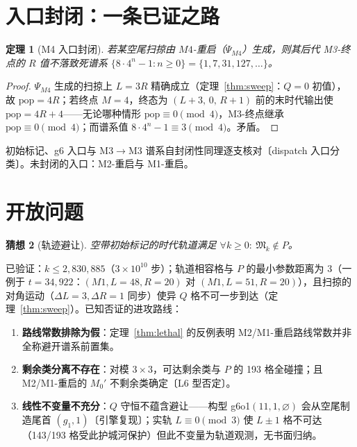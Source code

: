 \documentclass[11pt]{ctexart}
\newtheorem{theorem}{定理}[section]
\newtheorem{conjecture}[theorem]{猜想}
\begin{document}
\section{入口封闭：一条已证之路}

\begin{theorem}[M4 入口封闭]\label{thm:m4}
若某空尾扫掠由 $M4$-重启（$\Psi_{M4}$）生成，则其后代 M3-终点的 $R$ 值不落致死谱系 $\{8\cdot4^n-1:n\ge0\}=\{1,7,31,127,\dots\}$。
\end{theorem}
\begin{proof}
$\Psi_{M4}$ 生成的扫掠上 $L=3R$ 精确成立（定理~\ref{thm:sweep}：$Q=0$ 初值），故 $\mathrm{pop}=4R$；若终点 $M=4$，终态为 $(L{+}3,\,0,\,R{+}1)$ 前的末时代输出使 $\mathrm{pop}=4R{+}4$——无论哪种情形 $\mathrm{pop}\equiv0\pmod4$，M3-终点继承 $\mathrm{pop}\equiv0\pmod4$；而谱系值 $8\cdot4^n-1\equiv 3\pmod 4$。矛盾。
\end{proof}

初始标记、g6 入口与 M3$\to$M3 谱系自封闭性同理逐支核对〔dispatch 入口分类〕。未封闭的入口：M2-重启与 M1-重启。

\section{开放问题}\label{sec:open}

\begin{conjecture}[轨迹避让]\label{conj:avoid}
空带初始标记的时代轨道满足 $\forall k\ge0:\ \mathfrak M_k\notin P$。
\end{conjecture}

已验证：$k\le2{,}830{,}885$（$3\times10^{10}$ 步）；轨道相容格与 $P$ 的最小参数距离为 $3$（一例于 $t=34{,}922$：$(M1,L{=}48,R{=}20)$ 对 $(M1,L{=}51,R{=}20)$），且扫掠的对角运动（$\Delta L=3,\Delta R=1$ 同步）使异 $Q$ 格不可一步到达（定理~\ref{thm:sweep}）。已知否证的进攻路线：

\begin{enumerate}
\item \textbf{路线常数排除为假}：定理~\ref{thm:lethal} 的反例表明 M2/M1-重启路线常数并非全称避开谱系前置集。
\item \textbf{剩余类分离不存在}：对模 $3\times3$，可达剩余类与 $P$ 的 193 格全碰撞；且 M2/M1-重启的 $M_0'$ 不剩余类确定〔L6 型否定〕。
\item \textbf{线性不变量不充分}：$Q$ 守恒不蕴含避让——构型 g6o1$(11,1,\varnothing)$ 会从空尾制造尾首 $(g_1,1)$〔引擎复现〕；实轨 $L\equiv0\pmod3$ 使 $L\pm1$ 格不可达（143/193 格受此护城河保护）但此不变量为轨道观测，无书面归纳。
\end{enumerate}
\end{document}
